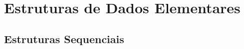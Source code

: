 \documentclass[11pt, openany]{book}
\begin{document}
\maketitle

\frontmatter

\tableofcontents

\mainmatter

\part{Estruturas de Dados Elementares}

\chapter{Estruturas Sequenciais}






\end{document}
